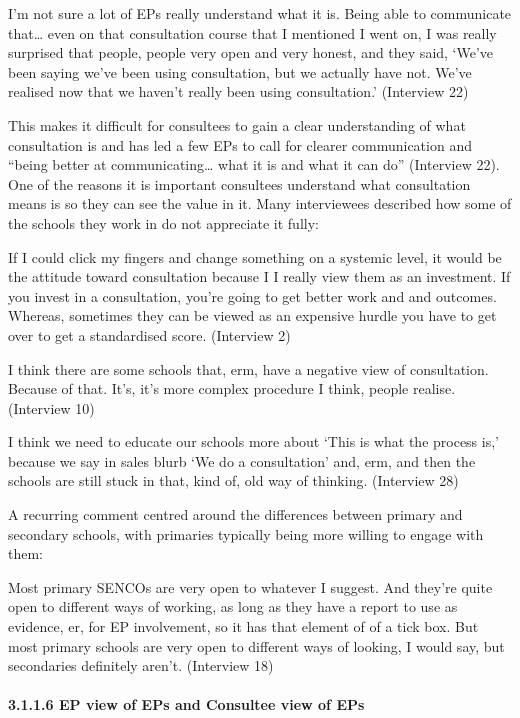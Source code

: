 \documentclass[
]{article}
\begin{document}
I'm not sure a lot of EPs really understand what it is. Being able to
communicate that\ldots{} even on that consultation course that I
mentioned I went on, I was really surprised that people, people very
open and very honest, and they said, `We've been saying we've been using
consultation, but we actually have not. We've realised now that we
haven't really been using consultation.' (Interview 22)

This makes it difficult for consultees to gain a clear understanding of
what consultation is and has led a few EPs to call for clearer
communication and ``being better at communicating\ldots{} what it is and
what it can do'' (Interview 22). One of the reasons it is important
consultees understand what consultation means is so they can see the
value in it. Many interviewees described how some of the schools they
work in do not appreciate it fully:

If I could click my fingers and change something on a systemic level, it
would be the attitude toward consultation because I I really view them
as an investment. If you invest in a consultation, you're going to get
better work and and outcomes. Whereas, sometimes they can be viewed as
an expensive hurdle you have to get over to get a standardised score.
(Interview 2)

I think there are some schools that, erm, have a negative view of
consultation. Because of that. It's, it's more complex procedure I
think, people realise. (Interview 10)

I think we need to educate our schools more about `This is what the
process is,' because we say in sales blurb `We do a consultation' and,
erm, and then the schools are still stuck in that, kind of, old way of
thinking. (Interview 28)

A recurring comment centred around the differences between primary and
secondary schools, with primaries typically being more willing to engage
with them:

Most primary SENCOs are very open to whatever I suggest. And they're
quite open to different ways of working, as long as they have a report
to use as evidence, er, for EP involvement, so it has that element of of
a tick box. But most primary schools are very open to different ways of
looking, I would say, but secondaries definitely aren't. (Interview 18)

\hypertarget{ep-view-of-eps-and-consultee-view-of-eps}{%
\paragraph{3.1.1.6 EP view of EPs and Consultee view of
EPs}\label{ep-view-of-eps-and-consultee-view-of-eps}}
\end{document}
